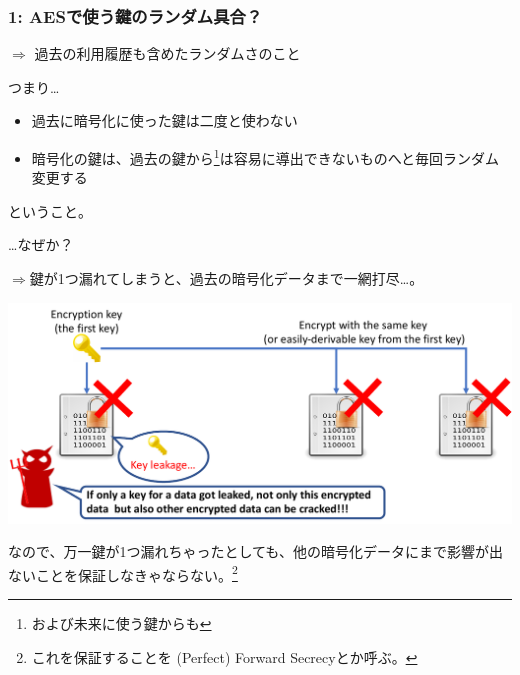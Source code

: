 \documentclass[12pt,dvipdfmx]{beamer}
\begin{document}
\begin{frame}
\frametitle{1: AESで使う鍵のランダム具合？}
$\Rightarrow$ \alert{過去の利用履歴も含めたランダムさ}のこと

\vspace{1ex}

\begin{block}{}
つまり…
\begin{itemize}
\item 過去に暗号化に使った鍵は\alert{二度と使わない}
\item 暗号化の鍵は、過去の鍵から\footnote[frame]{および未来に使う鍵からも}は容易に導出できないものへと\alert{毎回ランダム変更}する
\end{itemize}
ということ。
\end{block}

\end{frame}

\begin{frame}
…なぜか？

$\Rightarrow$鍵が1つ漏れてしまうと、過去の暗号化データまで一網打尽…。

\begin{center}
\includegraphics[width=0.9\linewidth]{Figs/pfs_bad_case.pdf}
\end{center}

\begin{block}{}
なので、万一鍵が1つ漏れちゃったとしても、他の暗号化データにまで影響が出ないことを保証しなきゃならない。\footnote[frame]{これを保証することを (Perfect) Forward Secrecyとか呼ぶ。}
\end{block}

\end{frame}
\end{document}
